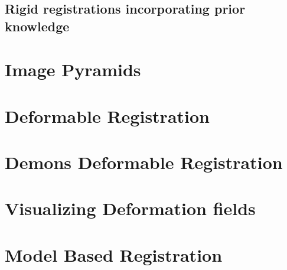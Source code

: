 \subsection{Rigid registrations incorporating prior knowledge}
\label{sec:RegistrationCentered2DTransform}
\ifitkFullVersion

\fi


\clearpage


\section{Image Pyramids}
\label{sec:ImagePyramids}
\ifitkFullVersion

\fi


\clearpage

\section{Deformable Registration}
\label{sec:DeformableRegistration}
\ifitkFullVersion

\fi

\clearpage

\section{Demons Deformable Registration}
\label{sec:DemonsDeformableRegistration}
\ifitkFullVersion

\fi

\section{Visualizing Deformation fields}
\label{sec:VisualizingDeformationFields}
\ifitkFullVersion

\fi

\ifitkFullVersion

\fi


\clearpage



\section{Model Based Registration}
\label{sec:ModelBasedRegistration}
\ifitkFullVersion

\fi


